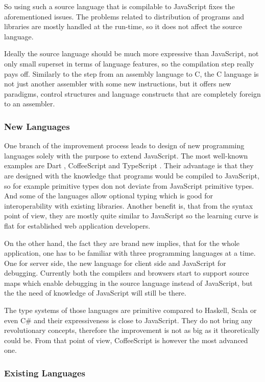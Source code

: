 \documentclass[12pt,a4paper]{report}
\begin{document}
So using such a source language that is compilable to JavaScript fixes the aforementioned issues. The problems related to distribution of programs and libraries are mostly handled at the run-time, so it does not affect the source language.

Ideally the source language should be much more expressive than JavaScript, not only small superset in terms of language features, so the compilation step really pays off. Similarly to the step from an assembly language to C, the C language is not just another assembler with some new instructions, but it offers new paradigms, control structures and language constructs that are completely foreign to an assembler.

\subsubsection*{New Languages} 

One branch of the improvement process leads to design of new programming languages solely with the purpose to extend JavaScript. The most well-known examples are Dart \cite{Dart}, CoffeeScript \cite{CoffeeScript} and TypeScript \cite{TypeScript}. Their advantage is that they are designed with the knowledge that programs would be compiled to JavaScript, so for example primitive types don not deviate from JavaScript primitive types. And some of the languages allow optional typing which is good for interoperability with existing libraries. Another benefit is, that from the syntax point of view, they are mostly quite similar to JavaScript so the learning curve is flat for established web application developers. 

On the other hand, the fact they are brand new implies, that for the whole application, one has to be familiar with three programming languages at a time. One for server side, the new language for client side and JavaScript for debugging. Currently both the compilers and browsers start to support source maps which enable debugging in the source language instead of JavaScript, but the the need of knowledge of JavaScript will still be there. 

The type systems of those languages are primitive compared to Haskell, Scala or even C\# and their expressiveness is close to JavaScript. They do not bring any revolutionary concepts, therefore the improvement is not as big as it theoretically could be. From that point of view, CoffeeScript is however the most advanced one.

\subsubsection*{Existing Languages} 
\end{document}
